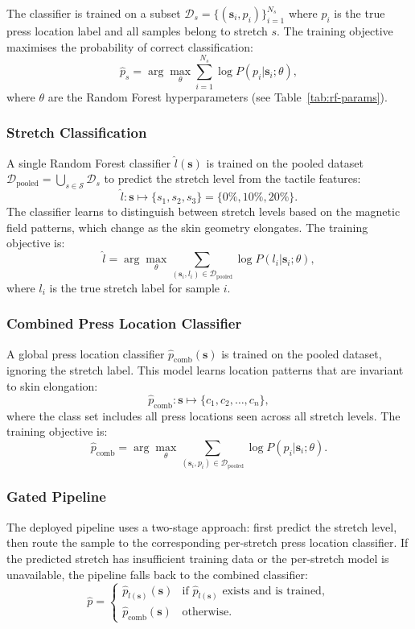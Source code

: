 \documentclass[11pt,a4paper]{article}
\begin{document}
The classifier is trained on a subset \(\mathcal{D}_s = \{(\mathbf{s}_i, p_i)\}_{i=1}^{N_s}\) where \(p_i\)
is the true press location label and all samples belong to stretch \(s\). The training objective
maximises the probability of correct classification:
\[
    \hat{p}_s = \arg\max_{\theta} \sum_{i=1}^{N_s} \log P(p_i | \mathbf{s}_i; \theta),
\]
where \(\theta\) are the Random Forest hyperparameters (see Table~\ref{tab:rf-params}).

\subsubsection{Stretch Classification}
A single Random Forest classifier \(\hat{l}(\mathbf{s})\) is trained on the pooled dataset
\(\mathcal{D}_{\text{pooled}} = \bigcup_{s \in \mathcal{S}} \mathcal{D}_s\) to predict the stretch level
from the tactile features:
\[
    \hat{l}: \mathbf{s} \mapsto \{s_1, s_2, s_3\} = \{0\%, 10\%, 20\%\}.
\]
The classifier learns to distinguish between stretch levels based on the magnetic field patterns,
which change as the skin geometry elongates. The training objective is:
\[
    \hat{l} = \arg\max_{\theta} \sum_{(\mathbf{s}_i, l_i) \in \mathcal{D}_{\text{pooled}}} \log P(l_i | \mathbf{s}_i; \theta),
\]
where \(l_i\) is the true stretch label for sample \(i\).

\subsubsection{Combined Press Location Classifier}
A global press location classifier \(\hat{p}_{\text{comb}}(\mathbf{s})\) is trained on the pooled dataset,
ignoring the stretch label. This model learns location patterns that are invariant to skin elongation:
\[
    \hat{p}_{\text{comb}}: \mathbf{s} \mapsto \{c_1, c_2, \ldots, c_n\},
\]
where the class set includes all press locations seen across all stretch levels. The training
objective is:
\[
    \hat{p}_{\text{comb}} = \arg\max_{\theta} \sum_{(\mathbf{s}_i, p_i) \in \mathcal{D}_{\text{pooled}}} \log P(p_i | \mathbf{s}_i; \theta).
\]

\subsubsection{Gated Pipeline}
The deployed pipeline uses a two-stage approach: first predict the stretch level, then route the
sample to the corresponding per-stretch press location classifier. If the predicted stretch has
insufficient training data or the per-stretch model is unavailable, the pipeline falls back to the
combined classifier:
\[
    \hat{p} = \begin{cases}
        \hat{p}_{\hat{l}(\mathbf{s})}(\mathbf{s}) & \text{if } \hat{p}_{\hat{l}(\mathbf{s})} \text{ exists and is trained}, \\
        \hat{p}_{\text{comb}}(\mathbf{s}) & \text{otherwise}.
    \end{cases}
\]
\end{document}

